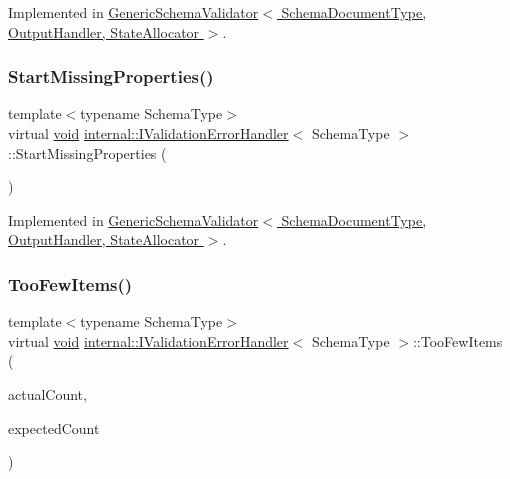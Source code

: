 Implemented in \hyperlink{classGenericSchemaValidator_ac4faa073bc4671f42e98a59a9e9cb01a}{Generic\+Schema\+Validator$<$ Schema\+Document\+Type, Output\+Handler, State\+Allocator $>$}.

\mbox{\label{classinternal_1_1IValidationErrorHandler_ac0073bef86b572b4517876b304aada0f}} 
\subsubsection{\texorpdfstring{Start\+Missing\+Properties()}{StartMissingProperties()}}
{\footnotesize\ttfamily template$<$typename Schema\+Type$>$ \\
virtual \hyperlink{imgui__impl__opengl3__loader_8h_ac668e7cffd9e2e9cfee428b9b2f34fa7}{void} \hyperlink{classinternal_1_1IValidationErrorHandler}{internal\+::\+I\+Validation\+Error\+Handler}$<$ Schema\+Type $>$\+::Start\+Missing\+Properties (\begin{DoxyParamCaption}{ }\end{DoxyParamCaption})\hspace{0.3cm}{\ttfamily [pure virtual]}}



Implemented in \hyperlink{classGenericSchemaValidator_a41c4d67e349561f13948a5045bfc50c9}{Generic\+Schema\+Validator$<$ Schema\+Document\+Type, Output\+Handler, State\+Allocator $>$}.

\mbox{\label{classinternal_1_1IValidationErrorHandler_afc144690ba0e24636a72f541efd32c3b}} 
\subsubsection{\texorpdfstring{Too\+Few\+Items()}{TooFewItems()}}
{\footnotesize\ttfamily template$<$typename Schema\+Type$>$ \\
virtual \hyperlink{imgui__impl__opengl3__loader_8h_ac668e7cffd9e2e9cfee428b9b2f34fa7}{void} \hyperlink{classinternal_1_1IValidationErrorHandler}{internal\+::\+I\+Validation\+Error\+Handler}$<$ Schema\+Type $>$\+::Too\+Few\+Items (\begin{DoxyParamCaption}\item[{\hyperlink{rapidjson_8h_a5ed6e6e67250fadbd041127e6386dcb5}{Size\+Type}}]{actual\+Count,  }\item[{\hyperlink{rapidjson_8h_a5ed6e6e67250fadbd041127e6386dcb5}{Size\+Type}}]{expected\+Count }\end{DoxyParamCaption})\hspace{0.3cm}{\ttfamily [pure virtual]}}



